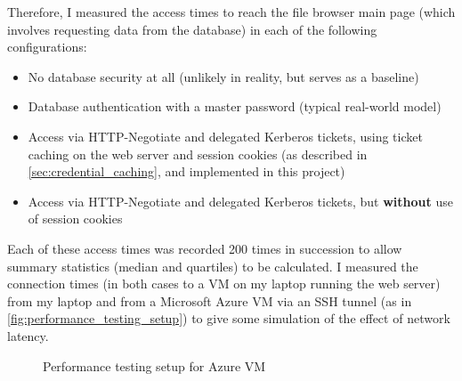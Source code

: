 \documentclass[12pt]{report}
\begin{document}
Therefore, I measured the access times to reach the file browser main page (which involves requesting data from the database) in each of the following configurations:
\begin{itemize}
\item
  No database security at all (unlikely in reality, but serves as a baseline)
\item
  Database authentication with a master password (typical real-world model)
\item
  Access via HTTP-Negotiate and delegated Kerberos tickets, using ticket caching on the web server and session cookies (as described in \autoref{sec:credential_caching}, and implemented in this project)
\item
  Access via HTTP-Negotiate and delegated Kerberos tickets, but \textbf{without} use of session cookies
\end{itemize}

Each of these access times was recorded 200 times in succession to allow summary statistics (median and quartiles) to be calculated. I measured the connection times (in both cases to a VM on my laptop running the web server) from my laptop and from a Microsoft Azure VM via an SSH tunnel (as in \autoref{fig:performance_testing_setup}) to give some simulation of the effect of network latency.

\begin{figure}[h]
  \begin{center}
  \end{center}
  \caption{Performance testing setup for Azure VM}
  \label{fig:performance_testing_setup}
\end{figure}
\end{document}

